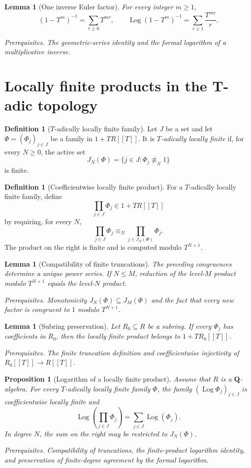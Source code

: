 \documentclass[10pt]{article}
\newtheorem{proposition}[theorem]{Proposition}
\newtheorem{lemma}[theorem]{Lemma}
\theoremstyle{definition}
\newtheorem{definition}[theorem]{Definition}
\newcommand{\deps}[1]{\par\smallskip\noindent\textit{Prerequisites.} #1}
\begin{document}
\begin{lemma}[One inverse Euler factor]
For every integer \(m\geq1\),
\[
 (1-T^m)^{-1}=\sum_{r\geq0}T^{mr},
 \qquad
 \operatorname{Log}(1-T^m)^{-1}
 =\sum_{r\geq1}\frac{T^{mr}}r.
\]
\deps{The geometric-series identity and the formal logarithm of a
multiplicative inverse.}
\end{lemma}

\section{Locally finite products in the T-adic topology}

\begin{definition}[\(T\)-adically locally finite family]
Let \(J\) be a set and let
\(\Phi=(\Phi_j)_{j\in J}\) be a family in \(1+TR[[T]]\).  It is
\emph{\(T\)-adically locally finite} if, for every \(N\geq0\), the active
set
\[
 J_N(\Phi)=\{j\in J:\Phi_j\not\equiv_N1\}
\]
is finite.
\end{definition}

\begin{definition}[Coefficientwise locally finite product]
For a \(T\)-adically locally finite family, define
\[
 \prod_{j\in J}\Phi_j\in1+TR[[T]]
\]
by requiring, for every \(N\),
\[
 \prod_{j\in J}\Phi_j
 \equiv_N\prod_{j\in J_N(\Phi)}\Phi_j.
\]
The product on the right is finite and is computed modulo \(T^{N+1}\).
\end{definition}

\begin{lemma}[Compatibility of finite truncations]
The preceding congruences determine a unique power series.  If
\(N\leq M\), reduction of the level-\(M\) product modulo \(T^{N+1}\)
equals the level-\(N\) product.
\deps{Monotonicity \(J_N(\Phi)\subseteq J_M(\Phi)\) and the fact that every
new factor is congruent to \(1\) modulo \(T^{N+1}\).}
\end{lemma}

\begin{lemma}[Subring preservation]
Let \(R_0\subseteq R\) be a subring.  If every \(\Phi_j\) has coefficients
in \(R_0\), then the locally finite product belongs to
\(1+TR_0[[T]]\).
\deps{The finite truncation definition and coefficientwise injectivity of
\(R_0[[T]]\to R[[T]]\).}
\end{lemma}

\begin{proposition}[Logarithm of a locally finite product]
Assume that \(R\) is a \(\mathbf Q\)-algebra.  For every \(T\)-adically
locally finite family \(\Phi\), the family
\((\operatorname{Log}\Phi_j)_{j\in J}\) is coefficientwise locally finite
and
\[
 \operatorname{Log}\left(\prod_{j\in J}\Phi_j\right)
 =\sum_{j\in J}\operatorname{Log}(\Phi_j).
\]
In degree \(N\), the sum on the right may be restricted to \(J_N(\Phi)\).
\deps{Compatibility of truncations, the finite-product logarithm identity,
and preservation of finite-degree agreement by the formal logarithm.}
\end{proposition}
\end{document}
